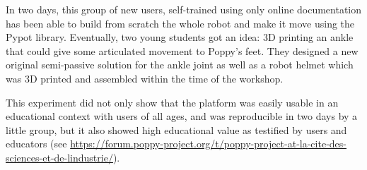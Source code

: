 \begin{figure}[]
\centering
    \hfil
    \caption{}
    \label{fig:universience_hackathon_orga}
\end{figure}

\begin{figure}[]
\centering
    \hfil
    \hfil
    \caption{}
    \label{fig:universience_conception}
\end{figure}

In two days, this group of new users, self-trained using only online documentation has been able to build from scratch the whole robot and make it move using the Pypot library. Eventually, two young students got an idea: 3D printing an ankle that could give some articulated movement to Poppy's feet. They designed a new original semi-passive solution for the ankle joint as well as a robot helmet which was 3D printed and assembled within the time of the workshop.

\begin{figure}[]
\centering
    \hfil
    \newline
    \hfil
    \caption{}
    \label{fig:universience_assembly}
\end{figure}

\begin{figure}[]
\centering
    \hfil
    \caption{}
    \label{fig:universience_conception}
\end{figure}

This experiment did not only show that the platform was easily usable in an educational context with users of all ages, and was reproducible in two days by a little group, but it also showed high educational value as testified by users and educators (see \url{https://forum.poppy-project.org/t/poppy-project-at-la-cite-des-sciences-et-de-lindustrie/}).

